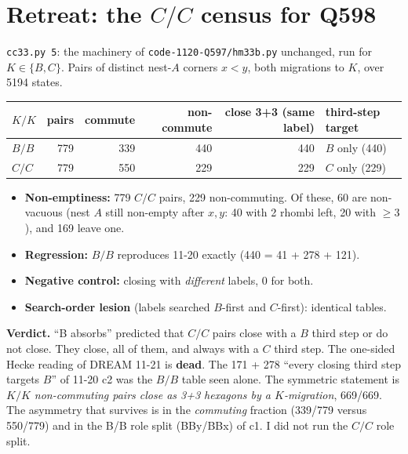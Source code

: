 \documentclass[11pt]{article}
\theoremstyle{definition}\newtheorem{definition}[theorem]{Definition}\newtheorem{remark}[theorem]{Remark}
\begin{document}
\section{Retreat: the $C/C$ census for Q598}\label{sec:cc}
\texttt{cc33.py 5}: the machinery of \texttt{code-1120-Q597/hm33b.py} unchanged, run for $K\in\{B,C\}$. Pairs of distinct nest-$A$ corners $x<y$, both migrations to $K$, over 5194 states.
\begin{center}\begin{tabular}{lrrrrl}\toprule
$K/K$ & pairs & commute & non-commute & close 3+3 (same label) & third-step target\\\midrule
$B/B$ & 779 & 339 & 440 & 440 & $B$ only (440)\\
$C/C$ & 779 & 550 & 229 & 229 & $C$ only (229)\\\bottomrule
\end{tabular}\end{center}
\begin{itemize}
\item \textbf{Non-emptiness:} 779 $C/C$ pairs, 229 non-commuting. Of these, 60 are non-vacuous (nest $A$ still non-empty after $x,y$: 40 with 2 rhombi left, 20 with $\ge3$), and 169 leave one.
\item \textbf{Regression:} $B/B$ reproduces 11-20 exactly (440 = 41 + 278 + 121).
\item \textbf{Negative control:} closing with \emph{different} labels, 0 for both.
\item \textbf{Search-order lesion} (labels searched $B$-first and $C$-first): identical tables.
\end{itemize}
\textbf{Verdict.} ``B absorbs'' predicted that $C/C$ pairs close with a $B$ third step or do not close. They close, all of them, and always with a \emph{$C$} third step. The one-sided Hecke reading of DREAM 11-21 is \textbf{dead}.
The 171 + 278 ``every closing third step targets $B$'' of 11-20 c2 was the $B/B$ table seen alone. The symmetric statement is \emph{$K/K$ non-commuting pairs close as 3+3 hexagons by a $K$-migration}, 669/669.
The asymmetry that survives is in the \emph{commuting} fraction (339/779 versus 550/779) and in the B/B role split (BBy/BBx) of c1. I did not run the $C/C$ role split.
\end{document}
